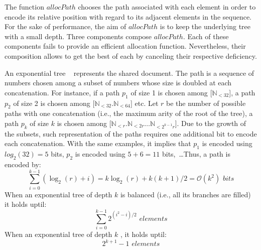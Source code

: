 The function $allocPath$ chooses the path associated with each element in order
to encode its relative position with regard to its adjacent elements in the
sequence. For the sake of performance, the aim of $allocPath$ is to keep the
underlying tree with a small depth. Three components compose $allocPath$. Each
of these components fails to provide an efficient allocation
function. Nevertheless, their composition allows to get the best of each by
canceling their respective deficiency.
\begin{asparadesc}
\item [An exponential tree]~\cite{andersson1996faster,andersson2007dynamic}
  represents the shared document. The path is a sequence of numbers chosen among
  a subset of numbers whose size is doubled at each concatenation. For instance,
  if a path $p_1$ of size 1 is chosen among [$\mathbb{N}_{<32}$], a path $p_2$
  of size 2 is chosen among [$\mathbb{N}_{<32}.\mathbb{N}_{<64}$] etc. Let $r$
  be the number of possible paths with one concatenation (i.e., the maximum
  arity of the root of the tree), a path $p_k$ of size $k$ is chosen among
  [$\mathbb{N}_{<r}.\mathbb{N}_{<2r}\ldots\mathbb{N}_{<2^{k-1}r}$].  Due to the
  growth of the subsets, such representation of the paths requires one
  additional bit to encode each concatenation. With the same examples, it
  implies that $p_1$ is encoded using $log_2(32)=5$ bits, $p_2$ is encoded using
  $5+6=11$ bits,~\ldots Thus, a path is encoded by:
  \begin{equation}
    \sum\limits_{i=0}^{k-1}(\log_2(r)+i) =
    k\log_2(r) + k(k+1)/2 = \mathcal{O}(k^2) \,\, bits
  \end{equation}
  When an exponential tree of depth $k$ is balanced (i.e., all its branches
  are filled) it holds uptil:
  \begin{equation} \sum\limits_{i=0}^{k-1} {2^{(i^2-i)/2}} \,\, elements
  \end{equation}
  When an exponential tree of depth $k$ , it holds uptil:
  \begin{equation} 2^{k+1}-1 \,\, elements\end{equation}
  

\end{asparadesc}
